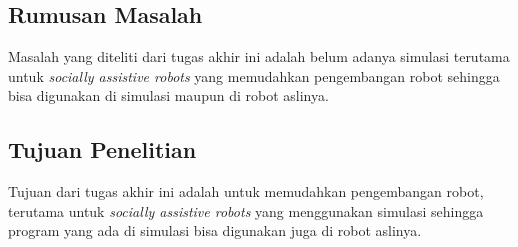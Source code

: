 \subsection{Rumusan Masalah}

Masalah yang diteliti dari tugas akhir ini adalah belum adanya simulasi terutama untuk \emph{socially assistive robots} yang memudahkan pengembangan robot sehingga bisa digunakan di simulasi maupun di robot aslinya.

\subsection{Tujuan Penelitian}

Tujuan dari tugas akhir ini adalah untuk memudahkan pengembangan robot, terutama untuk \emph{socially assistive robots} yang menggunakan simulasi sehingga program yang ada di simulasi bisa digunakan juga di robot aslinya.